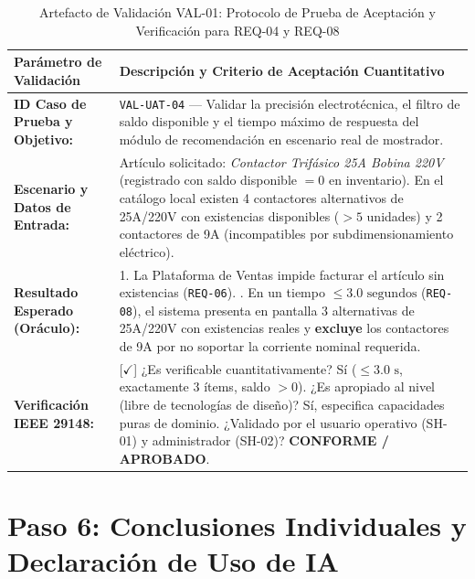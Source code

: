 \documentclass[conference,10pt]{IEEEtran}
\begin{document}
	\begin{table}[htbp]
		\centering
		\scriptsize
		\caption{Artefacto de Validación VAL-01: Protocolo de Prueba de Aceptación y Verificación para REQ-04 y REQ-08}
		\label{tab:artefacto_validacion}
		\begin{tabularx}{\textwidth}{>{\raggedright\arraybackslash}p{} Y}
			\toprule
			\textbf{Parámetro de Validación} & \textbf{Descripción y Criterio de Aceptación Cuantitativo} \\
			\midrule
			\textbf{ID Caso de Prueba y Objetivo:} & \texttt{VAL-UAT-04} --- Validar la precisión electrotécnica, el filtro de saldo disponible y el tiempo máximo de respuesta del módulo de recomendación en escenario real de mostrador. \\
			\textbf{Escenario y Datos de Entrada:} & Artículo solicitado: \textit{Contactor Trifásico 25A Bobina 220V} (registrado con saldo disponible $= 0$ en inventario). En el catálogo local existen 4 contactores alternativos de 25A/220V con existencias disponibles ($> 5$ unidades) y 2 contactores de 9A (incompatibles por subdimensionamiento eléctrico). \\
			\textbf{Resultado Esperado (Oráculo):} & 1. La Plataforma de Ventas impide facturar el artículo sin existencias (\texttt{REQ-06}). . En un tiempo $\le 3.0\text{ segundos}$ (\texttt{REQ-08}), el sistema presenta en pantalla 3 alternativas de 25A/220V con existencias reales y \textbf{excluye} los contactores de 9A por no soportar la corriente nominal requerida. \\
			\textbf{Verificación IEEE 29148:} & [$\checkmark$] ¿Es verificable cuantitativamente? Sí ($\le 3.0\text{ s}$, exactamente 3 ítems, saldo $>0$). \newline
			[$\checkmark$] ¿Es apropiado al nivel (libre de tecnologías de diseño)? Sí, especifica capacidades puras de dominio. \newline
			[$\checkmark$] ¿Validado por el usuario operativo (SH-01) y administrador (SH-02)? \textbf{CONFORME / APROBADO}. \\
			\bottomrule
		\end{tabularx}
	\end{table}
	\section{Paso 6: Conclusiones Individuales y Declaración de Uso de IA}
\end{document}
